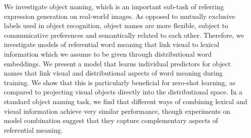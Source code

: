 We investigate object naming, which is an important sub-task of referring expression generation on real-world images. As opposed to mutually exclusive labels used in object recognition, object names are more flexible, subject to communicative preferences and semantically related to each other. Therefore, we investigate models of referential word meaning that link visual to lexical information which we assume to be given through distributional word embeddings. We present a model that learns individual predictors for object names that link visual and distributional aspects of word meaning during training. We show that this is particularly beneficial for zero-shot learning, as compared to projecting visual objects directly into the distributional space. In a standard object naming task, we find that different ways of combining lexical and visual information achieve very similar performance, though experiments on model combination suggest that they capture complementary aspects of referential meaning.
